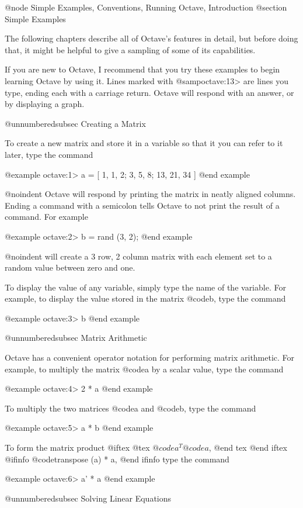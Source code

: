 @node Simple Examples, Conventions, Running Octave, Introduction
@section Simple Examples

The following chapters describe all of Octave's features in detail, but
before doing that, it might be helpful to give a sampling of some of its
capabilities.

If you are new to Octave, I recommend that you try these examples to
begin learning Octave by using it.  Lines marked with @samp{octave:13>}
are lines you type, ending each with a carriage return.  Octave will
respond with an answer, or by displaying a graph.

@unnumberedsubsec Creating a Matrix

To create a new matrix and store it in a variable so that it you can
refer to it later, type the command

@example
octave:1> a = [ 1, 1, 2; 3, 5, 8; 13, 21, 34 ]
@end example

@noindent
Octave will respond by printing the matrix in neatly aligned columns.
Ending a command with a semicolon tells Octave to not print the result
of a command.  For example

@example
octave:2> b = rand (3, 2);
@end example

@noindent
will create a 3 row, 2 column matrix with each element set to a random
value between zero and one.

To display the value of any variable, simply type the name of the
variable.  For example, to display the value stored in the matrix
@code{b}, type the command

@example
octave:3> b
@end example

@unnumberedsubsec Matrix Arithmetic

Octave has a convenient operator notation for performing matrix
arithmetic.  For example, to multiply the matrix @code{a} by a scalar
value, type the command

@example
octave:4> 2 * a
@end example

To multiply the two matrices @code{a} and @code{b}, type the command

@example
octave:5> a * b
@end example

To form the matrix product
@iftex
@tex
$@code{a}^T@code{a}$,
@end tex
@end iftex
@ifinfo
@code{transpose (a) * a},
@end ifinfo
type the command

@example
octave:6> a' * a
@end example

@unnumberedsubsec Solving Linear Equations


